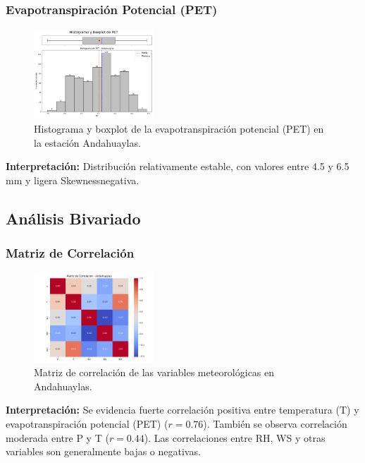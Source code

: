 \subsubsection*{Evapotranspiración Potencial (PET)}
\begin{figure}[H]
\centering
\includegraphics[width=0.4\textwidth]{resultados/por_estacion_meteorologica/Andahuaylas/PET_histograma.png}
\caption{Histograma y boxplot de la evapotranspiración potencial (PET) en la estación Andahuaylas.}
\label{fig:andahuaylas_PET}
\end{figure}
\textbf{Interpretación:} Distribución relativamente estable, con valores entre 4.5 y 6.5 mm y ligera Skewnessnegativa.

\subsection{Análisis Bivariado}

\subsubsection*{Matriz de Correlación}
\begin{figure}[H]
\centering
\includegraphics[width=0.4\textwidth]{resultados/por_estacion_meteorologica/Andahuaylas/matriz_correlacion.png}
\caption{Matriz de correlación de las variables meteorológicas en Andahuaylas.}
\label{fig:andahuaylas_corr}
\end{figure}
\textbf{Interpretación:} Se evidencia fuerte correlación positiva entre temperatura (T) y evapotranspiración potencial (PET) (\(r = 0.76\)). También se observa correlación moderada entre P y T (\(r = 0.44\)). Las correlaciones entre RH, WS y otras variables son generalmente bajas o negativas.

